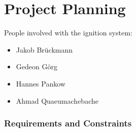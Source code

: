 \section{Project Planning}

People involved with the ignition system: 
        \begin{itemize}
            \item Jakob Brückmann
            \item Gedeon Görg
            \item Hannes Pankow
            \item Ahmad Quaeumachebache
        \end{itemize}
        \subsubsection{Requirements and Constraints}